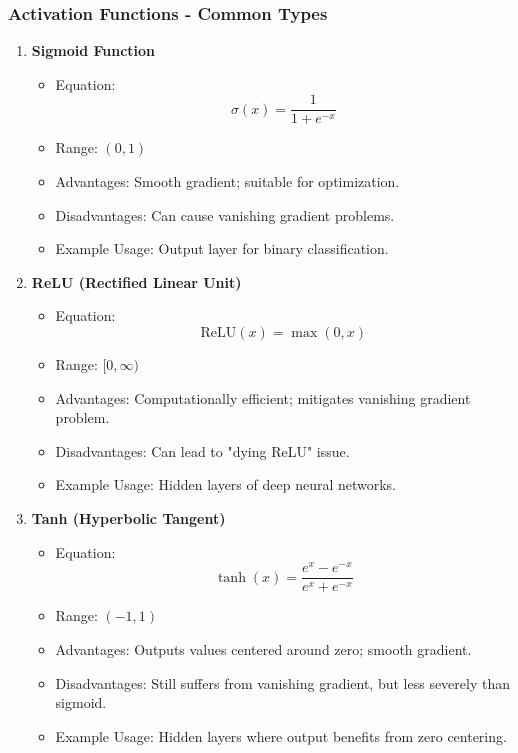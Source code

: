 \documentclass[aspectratio=169]{beamer}
\begin{document}
\begin{frame}[fragile]
    \frametitle{Activation Functions - Common Types}
    \begin{enumerate}
        \item \textbf{Sigmoid Function}
            \begin{itemize}
                \item Equation: 
                \begin{equation}
                \sigma(x) = \frac{1}{1 + e^{-x}}
                \end{equation}
                \item Range: \( (0, 1) \)
                \item Advantages: Smooth gradient; suitable for optimization.
                \item Disadvantages: Can cause vanishing gradient problems.
                \item Example Usage: Output layer for binary classification.
            \end{itemize}
        \item \textbf{ReLU (Rectified Linear Unit)}
            \begin{itemize}
                \item Equation: 
                \begin{equation}
                \text{ReLU}(x) = \max(0, x)
                \end{equation}
                \item Range: \( [0, \infty) \) 
                \item Advantages: Computationally efficient; mitigates vanishing gradient problem.
                \item Disadvantages: Can lead to "dying ReLU" issue.
                \item Example Usage: Hidden layers of deep neural networks.
            \end{itemize}
        \item \textbf{Tanh (Hyperbolic Tangent)}
            \begin{itemize}
                \item Equation: 
                \begin{equation}
                \tanh(x) = \frac{e^{x} - e^{-x}}{e^{x} + e^{-x}}
                \end{equation}
                \item Range: \( (-1, 1) \)
                \item Advantages: Outputs values centered around zero; smooth gradient.
                \item Disadvantages: Still suffers from vanishing gradient, but less severely than sigmoid.
                \item Example Usage: Hidden layers where output benefits from zero centering.
            \end{itemize}
    \end{enumerate}
\end{frame}
\end{document}
